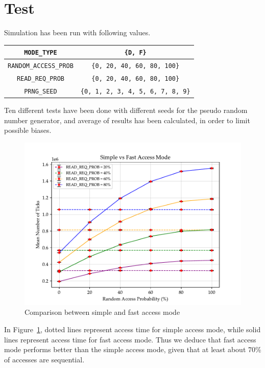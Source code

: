 \documentclass[a4paper,12pt]{article}
\begin{document}
\section{Test}
Simulation has been run with following values.

\begin{table}[H]
\center
\begin{tabular}{| c | c |}\hline
\texttt{MODE\_TYPE} & \texttt{\{D, F\}} \\ \hline
\texttt{RANDOM\_ACCESS\_PROB} & \texttt{\{0, 20, 40, 60, 80, 100\}} \\ \hline
\texttt{READ\_REQ\_PROB} & \texttt{\{0, 20, 40, 60, 80, 100\}} \\ \hline
\texttt{PRNG\_SEED} & \texttt{\{0, 1, 2, 3, 4, 5, 6, 7, 8, 9\}} \\ \hline
\end{tabular}
\end{table}

Ten different tests have been done with different seeds for the pseudo random number generator, and average of results has been calculated, in order to limit possible biases.

\begin{figure}[H]
  \includegraphics{img/test-simple-vs-fast.pdf}
  \caption{Comparison between simple and fast access mode}
  \label{fig:test-simple-vs-fast}
\end{figure}

In Figure~\ref{fig:test-simple-vs-fast}, dotted lines represent access time for simple access mode, while solid lines represent access time for fast access mode.
Thus we deduce that fast access mode performs better than the simple access mode, given that at least about 70\% of accesses are sequential.
\end{document}
